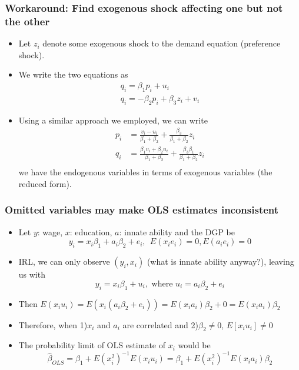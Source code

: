 \documentclass[aspectratio=169]{beamer}
\begin{document}
\begin{frame}
\frametitle{Workaround: Find exogenous shock affecting one but not the other}
\begin{itemize} 
\item Let $z_i$ denote some exogenous shock to the demand equation (preference shock). 
\item We write the two equations as 
\begin{gather*}
q_i = \beta_1p_i+u_i \tag{Supply}\\
q_i = -\beta_2p_i+\beta_3z_i+v_i \tag{Demand}
\end{gather*}
\item Using a similar approach we employed, we can write
\[
\begin{aligned}
p_i&=\frac{v_i-u_i}{\beta_1+\beta_2}+ \frac{\beta_3}{\beta_1+\beta_2}z_i\\
q_i&=\frac{\beta_1v_i + \beta_2u_i}{\beta_1+\beta_2}+\frac{\beta_3\beta_1}{\beta_1+\beta_2}z_i\\
\end{aligned}
\]
we have the endogenous variables in terms of exogenous variables (the reduced form). 
\end{itemize}
\end{frame}

\begin{frame}
\frametitle{Omitted variables may make OLS estimates inconsistent}
\begin{itemize} 
\item Let $y$: wage, $x$: education, $a$: innate ability and the DGP be
\[
y_ i = x_i\beta_1+a_i\beta_2+e_i, \ \ E(x_ie_i)=0, E(a_ie_i)=0
\]
\item IRL, we can only observe $(y_i, x_i)$ (what is innate ability anyway?), leaving us with 
\[
y_i=x_i\beta_1+u_i,\text{ where } u_i=a_i\beta_2 + e_i
\] 
\item Then $E(x_iu_i)= E(x_i(a_i\beta_2+e_i))=E(x_ia_i)\beta_2+0 = E(x_ia_i)\beta_2$
\item Therefore, when 1)$x_i$ and $a_i$ are correlated and 2)$\beta_2\neq0$, $E[x_iu_i]\neq0$
\item The probability limit of OLS estimate of $x_i$ would be
\[
\hat{\beta}_{OLS}=\beta_1+E(x_i^2)^{-1}E(x_iu_i)=\beta_1+E(x_i^2)^{-1}E(x_ia_i)\beta_2
\]
\end{itemize}
\end{frame}
\end{document}
